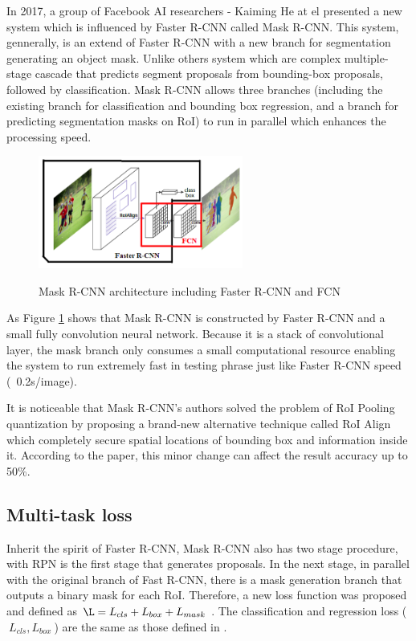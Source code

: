 	In 2017, a group of Facebook AI researchers - Kaiming He at el presented a new system which is influenced by Faster R-CNN called Mask R-CNN. This system, gennerally, is an extend of Faster R-CNN with a new branch for segmentation generating an object mask. Unlike others system which are complex multiple-stage cascade that predicts segment proposals from bounding-box proposals, followed by classification. Mask R-CNN allows three branches (including the existing branch for classification and bounding box regression, and a branch for predicting segmentation masks on RoI) to run in parallel which enhances the processing speed.	
	
	\begin{figure}[H]
		\centering
		{\includegraphics[width=0.6\textwidth]{./hinhanh/chap5/mask_rcnn.png}}
		\caption{Mask R-CNN architecture including Faster R-CNN and FCN}
		\label{fig:maskrcnn}
	\end{figure}
	
	As Figure \ref{fig:maskrcnn} shows that Mask R-CNN is constructed by Faster R-CNN and a small fully convolution neural network. Because it is a stack of convolutional layer, the mask branch only consumes a small computational resource enabling the system to run extremely fast in testing phrase just like Faster R-CNN speed (~0.2s/image). 
	
	It is noticeable that Mask R-CNN’s authors solved the problem of RoI Pooling quantization by proposing a brand-new alternative technique called RoI Align which completely secure spatial locations of bounding box and information inside it. According to the paper, this minor change can affect the result accuracy up to 50\%.
	
\subsection{Multi-task loss}
\label{subsection:multitaskloss}
\noindent
	
	Inherit the spirit of Faster R-CNN, Mask R-CNN also has two stage procedure, with RPN is the first stage that generates proposals. In the next stage, in parallel with the original branch of Fast R-CNN, there is a mask generation branch that outputs a binary mask for each RoI. Therefore, a new loss function was proposed and defined as $ \L = L_{cls} + L_{box} + L_{mask}\ $. The classification and regression loss ($ \ L_{cls}, L_{box} \ $) are the same as those defined in \cite{fastrcnn}. 
	
